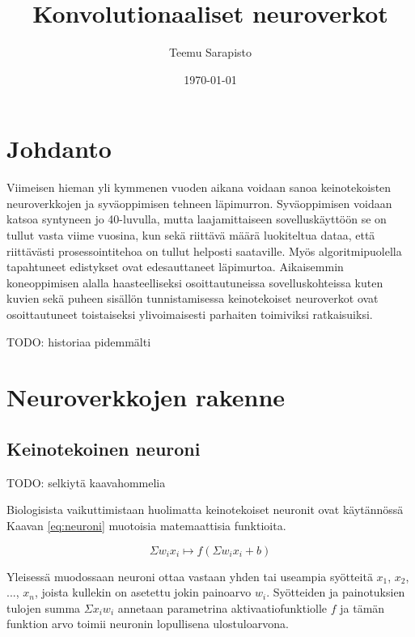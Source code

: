 \documentclass[finnish]{tktltiki2}
\title{Konvolutionaaliset neuroverkot}
\author{Teemu Sarapisto}
\date{\today}
\theoremstyle{definition}
\theoremstyle{remark}
\begin{document}

  \frontmatter      %

  \maketitle        %
  \makeabstract     %

  \tableofcontents  %


  \mainmatter       %

  \section{Johdanto}

  Viimeisen hieman yli kymmenen vuoden aikana voidaan sanoa keinotekoisten neuroverkkojen ja syväoppimisen tehneen läpimurron. Syväoppimisen voidaan katsoa syntyneen jo 40-luvulla, mutta laajamittaiseen sovelluskäyttöön se on tullut vasta viime vuosina, kun sekä riittävä määrä luokiteltua dataa, että riittävästi prosessointitehoa on tullut helposti saataville. Myös algoritmipuolella tapahtuneet edistykset ovat edesauttaneet läpimurtoa. Aikaisemmin koneoppimisen alalla haasteelliseksi osoittautuneissa sovelluskohteissa kuten kuvien sekä puheen sisällön tunnistamisessa keinotekoiset neuroverkot ovat osoittautuneet toistaiseksi ylivoimaisesti parhaiten toimiviksi ratkaisuiksi.


  TODO: historiaa pidemmälti
  \section{Neuroverkkojen rakenne}
  \subsection{Keinotekoinen neuroni}

    TODO: selkiytä kaavahommelia

    Biologisista vaikuttimistaan huolimatta keinotekoiset neuronit ovat käytännössä Kaavan \ref{eq:neuroni} muotoisia matemaattisia funktioita.

    \begin{equation}
      \label{eq:neuroni}
      \Sigma w_i x_i \mapsto f(\Sigma w_i x_i + b)
    \end{equation}

    Yleisessä muodossaan neuroni ottaa vastaan yhden tai useampia syötteitä $x_1$, $x_2$, ..., $x_n$, joista kullekin on asetettu jokin painoarvo $w_i$. Syötteiden ja painotuksien tulojen summa $\Sigma x_i w_i$ annetaan parametrina aktivaatiofunktiolle $f$ ja tämän funktion arvo toimii neuronin lopullisena ulostuloarvona.
\end{document}
